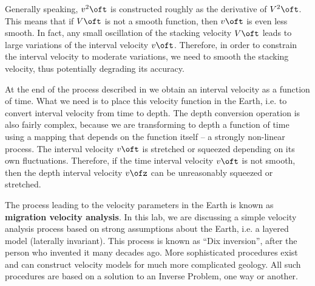 Generally speaking, $v^2\oft$ is constructed roughly as the derivative
of $V^2\oft$. This means that if $V\oft$ is not a smooth function,
then $v\oft$ is even less smooth. In fact, any small oscillation of
the stacking velocity $V\oft$ leads to large variations of the
interval velocity $v\oft$. Therefore, in order to constrain the
interval velocity to moderate variations, we need to smooth the
stacking velocity, thus potentially degrading its accuracy.

At the end of the process described in  we obtain an interval
velocity as a function of time. What we need is to place this velocity
function in the Earth, i.e. to convert interval velocity from time to
depth. The depth conversion operation is also fairly complex, because
we are transforming to depth a function of time using a mapping that
depends on the function itself -- a strongly non-linear process. The
interval velocity $v\oft$ is stretched or squeezed depending on its
own fluctuations. Therefore, if the time interval velocity $v\oft$ is
not smooth, then the depth interval velocity $v\ofz$ can be
unreasonably squeezed or stretched.

The process leading to the velocity parameters in the Earth is known
as \textbf{migration velocity analysis}. In this lab, we are
discussing a simple velocity analysis process based on strong
assumptions about the Earth, i.e. a layered model (laterally
invariant). This process is known as ``Dix inversion'', after the
person who invented it many decades ago. More sophisticated procedures
exist and can construct velocity models for much more complicated
geology. All such procedures are based on a solution to an Inverse
Problem, one way or another.
